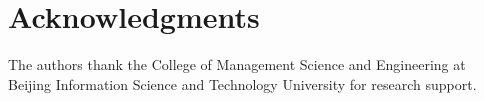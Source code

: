 \section*{Acknowledgments}
The authors thank the College of Management Science and Engineering at Beijing Information Science and Technology University for research support.

